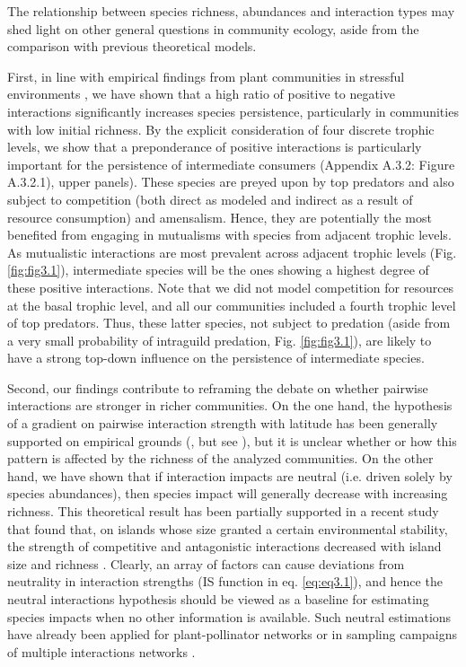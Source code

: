 The relationship between species richness, abundances and interaction types may shed light on other general questions in community ecology, aside from the comparison with previous theoretical models.

First, in line with empirical findings from plant communities in stressful environments \citep{Soliveres2014, Cavieres2009}, we have shown that a high ratio of positive to negative interactions significantly increases species persistence, particularly in communities with low initial richness. By the explicit consideration of four discrete trophic levels, we show that a preponderance of positive interactions is particularly important for the persistence of intermediate consumers (Appendix A.3.2: Figure A.3.2.1), upper panels). These species are preyed upon by top predators and also subject to competition (both direct as modeled and indirect as a result of resource consumption) and amensalism. Hence, they are potentially the most benefited from engaging in mutualisms with species from adjacent trophic levels. As mutualistic interactions are most prevalent across adjacent trophic levels (Fig. \ref{fig:fig3.1}), intermediate species will be the ones showing a highest degree of these positive interactions. Note that we did not model competition for resources at the basal trophic level, and all our communities included a fourth trophic level of top predators. Thus, these latter species, not subject to predation (aside from a very small probability of intraguild predation, Fig. \ref{fig:fig3.1}), are likely to have a strong top-down influence on the persistence of intermediate species.

Second, our findings contribute to reframing the debate on whether pairwise interactions are stronger in richer communities. On the one hand, the hypothesis of a gradient on pairwise interaction strength with latitude has been generally supported on empirical grounds (\citealt{Schemske2009}, but see \citealt{Moles2016}), but it is unclear whether or how this pattern is affected by the richness of the analyzed communities. On the other hand, we have shown that if interaction impacts are neutral (i.e. driven solely by species abundances), then species impact will generally decrease with increasing richness. This theoretical result has been partially supported in a recent study that found that, on islands whose size granted a certain environmental stability, the strength of competitive and antagonistic interactions decreased with island size and richness \citep{Schoener2016}. Clearly, an array of factors can cause deviations from neutrality in interaction strengths (IS function in eq. \ref{eq:eq3.1}), and hence the neutral interactions hypothesis should be viewed as a baseline for estimating species impacts when no other information is available. Such neutral estimations have already been applied for plant-pollinator networks \citep{Vazquez2012} or in sampling campaigns of multiple interactions networks \citep{Pocock2012}.

